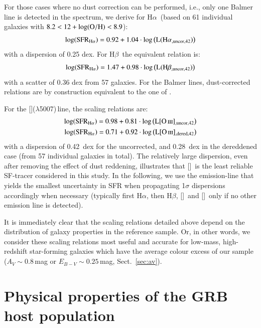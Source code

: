\documentclass[traditabstract, longauth]{aa}
\newcommand{\hb}{H$\beta$}
\newcommand{\ha}{H$\alpha$}
\newcommand{\oh}{12+\log(\rm{O/H})}
\newcommand{\oii}{[\ion{O}{ii}]}
\newcommand{\oiii}{[\ion{O}{iii}]}
\begin{document}
For those cases where no dust correction can be performed, i.e., only one Balmer line is detected in the spectrum, we derive for \ha\, (based on 61 individual galaxies with $8.2 < \oh < 8.9$):
\begin{equation}
\log(\rm{SFR_{H\alpha}}) = 0.92 + 1.04\cdot\log\left(L({\rm{H}\alpha_{\rm{,uncor,42}}})\right)
\end{equation}
with a dispersion of 0.25 dex. For \hb\, the equivalent relation is:
\begin{equation}
\log(\rm{SFR_{H\alpha}}) = 1.47 + 0.98\cdot\log\left(L({\rm{H}\beta_{\rm{,uncor,42}}})\right)
\end{equation}
with a scatter of 0.36 dex from 57 galaxies. For the Balmer lines, dust-corrected relations are by construction equivalent to the one of \citet{1998ARA&A..36..189K}.

For the \oiii($\lambda$5007)\,line, the scaling relations are:
\begin{equation}
\begin{split}
\log(\rm{SFR_{H\alpha}}) = 0.98 + 0.81\cdot\log\left(L{\oiii_{\rm{,uncor,42}}}\right)\\
\log(\rm{SFR_{H\alpha}}) = 0.71 + 0.92\cdot\log\left(L{\oiii_{\rm{,dered,42}}}\right)
\end{split}
\end{equation}
with a dispersion of 0.42~dex for the uncorrected, and 0.28~dex in the dereddened case (from 57 individual galaxies in total).  {The relatively large dispersion, even after removing the effect of dust reddening, illustrates that \oiii\, is the least reliable SF-tracer considered in this study.} In the following, we use the emission-line that yields the smallest uncertainty in SFR when propagating 1$\sigma$ dispersions accordingly when necessary (typically first \ha, then \hb, \oii\, and \oiii\, only if no other emission line is detected).

It is immediately clear that the scaling relations detailed above depend on the distribution of galaxy properties in the reference sample. Or, in other words, we consider these scaling relations most useful and accurate for low-mass, high-redshift star-forming galaxies which have the average colour excess of our sample ($A_V\sim0.8$\,mag or $E_{B-V}\sim0.25$\,mag, Sect.~\ref{sec:av}).

\section{Physical properties of the GRB host population}
\label{sec:prop}
\end{document}

